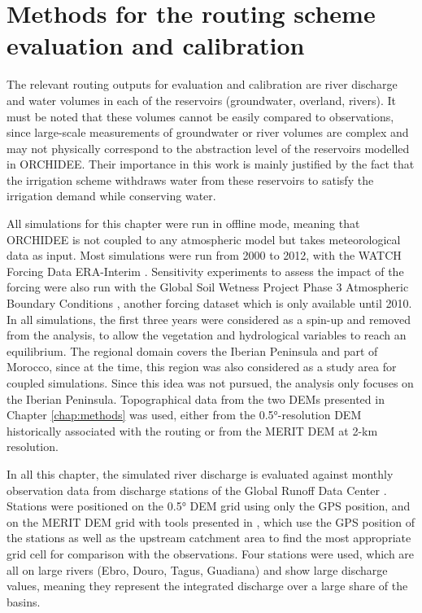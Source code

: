 \section{Methods for the routing scheme evaluation and calibration}

The relevant routing outputs for evaluation and calibration are river discharge and water volumes in each of the reservoirs (groundwater, overland, rivers). 
It must be noted that these volumes cannot be easily compared to observations, since large-scale measurements of groundwater or river volumes are complex and may not physically correspond to the abstraction level of the reservoirs modelled in ORCHIDEE.
Their importance in this work is mainly justified by the fact that the irrigation scheme withdraws water from these reservoirs to satisfy the irrigation demand while conserving water.

All simulations for this chapter were run in offline mode, meaning that ORCHIDEE is not coupled to any atmospheric model but takes meteorological data as input. 
Most simulations were run from 2000 to 2012, with the WATCH Forcing Data ERA-Interim \citep[WFDEI, ][]{weedon_wfdei_2014}. Sensitivity experiments to assess the impact of the forcing were also run with the Global Soil Wetness Project Phase 3 Atmospheric Boundary Conditions \citep[GSWP3, ][]{kim_hyungjun_global_2017}, another forcing dataset which is only available until 2010.
In all simulations, the first three years were considered as a spin-up and removed from the analysis, to allow the vegetation and hydrological variables to reach an equilibrium. The regional domain covers the Iberian Peninsula and part of Morocco, since at the time, this region was also considered as a study area for coupled simulations. Since this idea was not pursued, the analysis only focuses on the Iberian Peninsula.
Topographical data from the two DEMs presented in Chapter \ref{chap:methods} was used, either from the 0.5°-resolution DEM historically associated with the \std routing or from the MERIT DEM at 2-km resolution.

In all this chapter, the simulated river discharge is evaluated against monthly observation data from discharge stations of the Global Runoff Data Center \cite[GRDC, https://grdc.bafg.de,][]{fekete_global_2003}.
Stations were positioned on the 0.5° DEM grid using only the GPS position, and on the MERIT DEM grid with tools presented in \cite{polcher_hydrological_2023}, which use the GPS position of the stations as well as the upstream catchment area to find the most appropriate grid cell for comparison with the observations. 
Four stations were used, which are all on large rivers (Ebro, Douro, Tagus, Guadiana) and show large discharge values, meaning they represent the integrated discharge over a large share of the basins.

